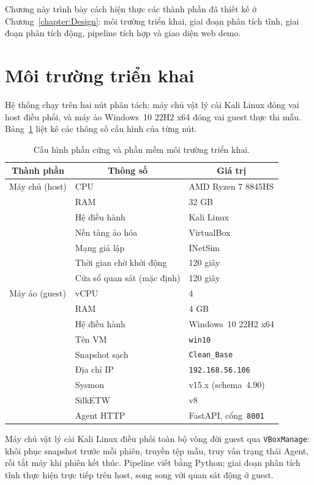 \documentclass[../DoAn.tex]{subfiles}
\begin{document}
Chương này trình bày cách hiện thực các thành phần đã thiết kế ở
Chương~\ref{chapter:Design}: môi trường triển khai, giai đoạn phân tích
tĩnh, giai đoạn phân tích động, pipeline tích hợp và giao diện web demo.

\section{Môi trường triển khai}
\label{section:4.1}

Hệ thống chạy trên hai nút phân tách: máy chủ vật lý cài
Kali Linux đóng vai host điều phối, và máy ảo Windows~10 22H2
x64 đóng vai guest thực thi mẫu. Bảng~\ref{tab:env-hardware}
liệt kê các thông số cấu hình của từng nút.
\begin{table}[H]
\centering
\caption{Cấu hình phần cứng và phần mềm môi trường triển khai.}
\label{tab:env-hardware}
\begin{tabular}{|l|l|l|}
\hline
\multicolumn{1}{|c|}{\textbf{Thành phần}} & \multicolumn{1}{c|}{\textbf{Thông số}} & \multicolumn{1}{c|}{\textbf{Giá trị}} \\
\hline
Máy chủ (host) & CPU                    & AMD Ryzen 7 8845HS \\
               & RAM                    & 32 GB \\
               & Hệ điều hành           & Kali Linux \\
               & Nền tảng ảo hóa        & VirtualBox \\
               & Mạng giả lập           & INetSim \\
               & Thời gian chờ khởi động & 120 giây \\
               & Cửa sổ quan sát (mặc định) & 120 giây \\
\hline
Máy ảo (guest) & vCPU                   & 4 \\
               & RAM                    & 4 GB \\
               & Hệ điều hành           & Windows~10 22H2 x64 \\
               & Tên VM                 & \texttt{win10} \\
               & Snapshot sạch          & \texttt{Clean\_Base} \\
               & Địa chỉ IP             & \texttt{192.168.56.106} \\
               & Sysmon                 & v15.x (schema~4.90) \\
               & SilkETW                & v8 \\
               & Agent HTTP             & FastAPI, cổng~\texttt{8001} \\
\hline
\end{tabular}
\end{table}
Máy chủ vật lý cài Kali Linux điều phối toàn bộ vòng đời guest
qua \texttt{VBoxManage}: khôi phục snapshot trước mỗi phiên, truyền
tệp mẫu, truy vấn trạng thái Agent, rồi tắt máy khi phiên kết thúc.
Pipeline viết bằng Python; giai đoạn phân tích tĩnh thực hiện trực
tiếp trên host, song song với quan sát động ở guest.
\end{document}
